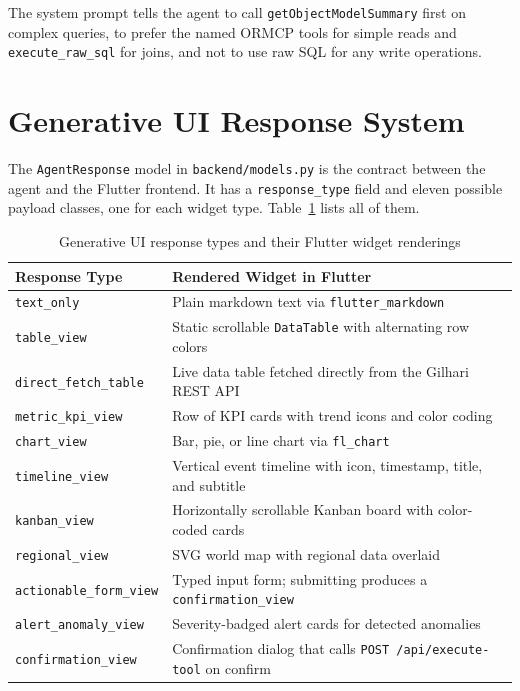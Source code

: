 \documentclass{book}
\begin{document}
The system prompt tells the agent to call \texttt{getObjectModelSummary} first on complex queries, to prefer the named ORMCP tools for simple reads and \texttt{execute\_raw\_sql} for joins, and not to use raw SQL for any write operations.

\section{Generative UI Response System}

The \texttt{AgentResponse} model in \texttt{backend/models.py} is the contract between the agent and the Flutter frontend. It has a \texttt{response\_type} field and eleven possible payload classes, one for each widget type. Table~\ref{tab:genui} lists all of them.

\begin{table}[ht]
\centering
\begin{tabular}{|p{4.5cm}|p{9cm}|}
\hline
\textbf{Response Type} & \textbf{Rendered Widget in Flutter} \\
\hline
\texttt{text\_only} & Plain markdown text via \texttt{flutter\_markdown} \\
\hline
\texttt{table\_view} & Static scrollable \texttt{DataTable} with alternating row colors \\
\hline
\texttt{direct\_fetch\_table} & Live data table fetched directly from the Gilhari REST API \\
\hline
\texttt{metric\_kpi\_view} & Row of KPI cards with trend icons and color coding \\
\hline
\texttt{chart\_view} & Bar, pie, or line chart via \texttt{fl\_chart} \\
\hline
\texttt{timeline\_view} & Vertical event timeline with icon, timestamp, title, and subtitle \\
\hline
\texttt{kanban\_view} & Horizontally scrollable Kanban board with color-coded cards \\
\hline
\texttt{regional\_view} & SVG world map with regional data overlaid \\
\hline
\texttt{actionable\_form\_view} & Typed input form; submitting produces a \texttt{confirmation\_view} \\
\hline
\texttt{alert\_anomaly\_view} & Severity-badged alert cards for detected anomalies \\
\hline
\texttt{confirmation\_view} & Confirmation dialog that calls \texttt{POST /api/execute-tool} on confirm \\
\hline
\end{tabular}
\caption{Generative UI response types and their Flutter widget renderings}
\label{tab:genui}
\end{table}
\end{document}
